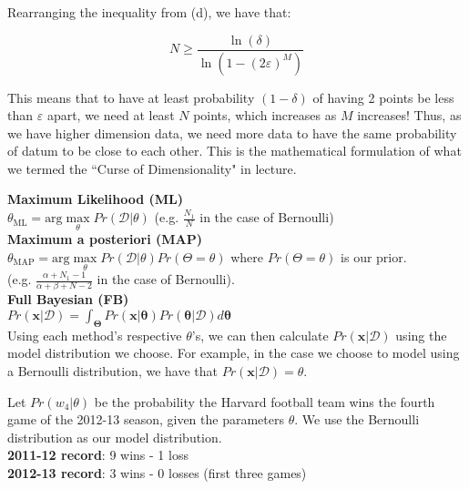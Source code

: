 \documentclass[12pt]{article}
\begin{document}
Rearranging the inequality from (d), we have that:

$$
N \ge \frac{\ln(\delta)}{\ln(1-(2\varepsilon)^M)}
$$

This means that to have at least probability $(1-\delta)$ of having 2 points be less than $\varepsilon$ apart, we need at least $N$ points, which increases as $M$ increases! Thus, as we have higher dimension data, we need more data to have the same probability of datum to be close to each other. This is the mathematical formulation of what we termed the ``Curse of Dimensionality" in lecture.


\pagebreak

\textbf{Maximum Likelihood (ML)} \\

$\theta_{\text{ML}} = \text{arg}\max\limits_{\theta} Pr(\mathcal{D} | \theta) $ (e.g. $\frac{N_1}{N}$ in the case of Bernoulli) \\

\textbf{Maximum a posteriori (MAP)} \\

$\theta_{\text{MAP}} = \text{arg}\max\limits_{\theta} Pr(\mathcal{D} | \theta) Pr(\Theta = \theta)$ where $Pr(\Theta = \theta)$ is our prior. \\ (e.g. $\frac{\alpha+N_1-1}{\alpha + \beta + N - 2}$ in the case of Bernoulli). \\

\textbf{Full Bayesian (FB)} \\

$Pr(\boldsymbol{x}|\mathcal{D}) = \int_{\boldsymbol{\Theta}} Pr(\boldsymbol{x} | \boldsymbol{\theta})Pr(\boldsymbol{\theta}|\mathcal{D})d\boldsymbol{\theta}$ \\

Using each method's respective $\theta$'s, we can then calculate $Pr(\boldsymbol{x}|\mathcal{D})$ using the model distribution we choose. For example, in the case we choose to model using a Bernoulli distribution, we have that $Pr(\boldsymbol{x}|\mathcal{D}) = \theta$.

\pagebreak

Let $Pr(w_4 | \theta)$ be the probability the Harvard football team wins the fourth game of the 2012-13 season, given the parameters $\theta$. We use the Bernoulli distribution as our model distribution.\\

\textbf{2011-12 record}: 9 wins - 1 loss \\
\textbf{2012-13 record}: 3 wins - 0 losses  (first three games) \\
\end{document}
